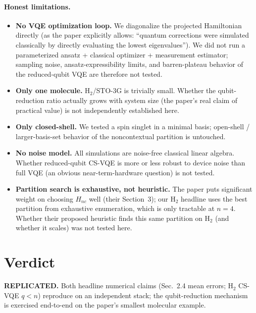 \documentclass[11pt]{article}
\begin{document}
\paragraph{Honest limitations.}
\begin{itemize}\itemsep0pt
\item \textbf{No VQE optimization loop.} We diagonalize the projected
Hamiltonian directly (as the paper explicitly allows: ``quantum
corrections were simulated classically by directly evaluating the lowest
eigenvalues''). We did not run a parameterized ansatz + classical
optimizer + measurement estimator; sampling noise, ansatz-expressibility
limits, and barren-plateau behavior of the reduced-qubit VQE are
therefore not tested.
\item \textbf{Only one molecule.} H$_2$/STO-3G is trivially small.
Whether the qubit-reduction ratio actually grows with system size (the
paper's real claim of practical value) is not independently established
here.
\item \textbf{Only closed-shell.} We tested a spin singlet in a minimal
basis; open-shell / larger-basis-set behavior of the noncontextual
partition is untouched.
\item \textbf{No noise model.} All simulations are noise-free classical
linear algebra. Whether reduced-qubit CS-VQE is more or less robust to
device noise than full VQE (an obvious near-term-hardware question) is
not tested.
\item \textbf{Partition search is exhaustive, not heuristic.} The paper
puts significant weight on choosing $H_{nc}$ well (their Section~3);
our H$_2$ headline uses the best partition from exhaustive enumeration,
which is only tractable at $n\!=\!4$. Whether their proposed heuristic
finds this same partition on H$_2$ (and whether it scales) was not
tested here.
\end{itemize}

\section{Verdict}
\textbf{REPLICATED.} Both headline numerical claims (Sec.~2.4 mean
errors; H$_2$ CS-VQE $q\!<\!n$) reproduce on an independent stack;
the qubit-reduction mechanism is exercised end-to-end on the paper's
smallest molecular example.


\end{document}
